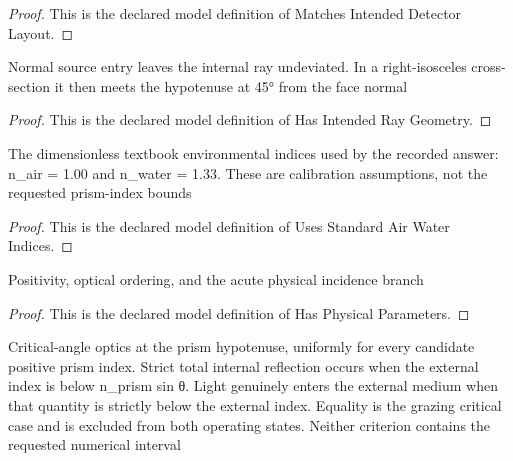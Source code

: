 \begin{proof}
  This is the declared model definition of Matches Intended Detector Layout.
\end{proof}
\begin{definition}
  \label{def:physics:phyx-mini-0147:phyxminiproblems-problemphyxmini0147-hasintendedraygeometry}
  Normal source entry leaves the internal ray undeviated. In a right-isosceles cross-section it then meets the hypotenuse at 45° from the face normal
\end{definition}
\begin{proof}
  This is the declared model definition of Has Intended Ray Geometry.
\end{proof}
\begin{definition}
  \label{def:physics:phyx-mini-0147:phyxminiproblems-problemphyxmini0147-usesstandardairwaterindices}
  The dimensionless textbook environmental indices used by the recorded answer: n\_air = 1.00 and n\_water = 1.33. These are calibration assumptions, not the requested prism-index bounds
\end{definition}
\begin{proof}
  This is the declared model definition of Uses Standard Air Water Indices.
\end{proof}
\begin{definition}
  \label{def:physics:phyx-mini-0147:phyxminiproblems-problemphyxmini0147-hasphysicalparameters}
  Positivity, optical ordering, and the acute physical incidence branch
\end{definition}
\begin{proof}
  This is the declared model definition of Has Physical Parameters.
\end{proof}
\begin{definition}
  \label{def:physics:phyx-mini-0147:phyxminiproblems-problemphyxmini0147-satisfiesprisminterfaceoptics}
  Critical-angle optics at the prism hypotenuse, uniformly for every candidate positive prism index. Strict total internal reflection occurs when the external index is below n\_prism sin θ. Light genuinely enters the external medium when that quantity is strictly below the external index. Equality is the grazing critical case and is excluded from both operating states. Neither criterion contains the requested numerical interval
\end{definition}
